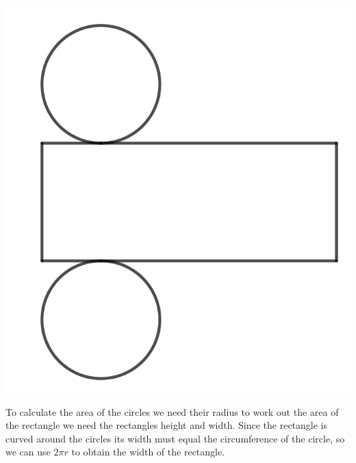 \includegraphics{./Images/Measurement/CylinderNet.png}

\bigskip

To calculate the area of the circles we need their radius to work out the area of the rectangle we need the rectangles height and width.  Since the rectangle is curved around the circles its width must equal the circumference of the circle, so we can use $2 \pi r$ to obtain the width of the rectangle.

